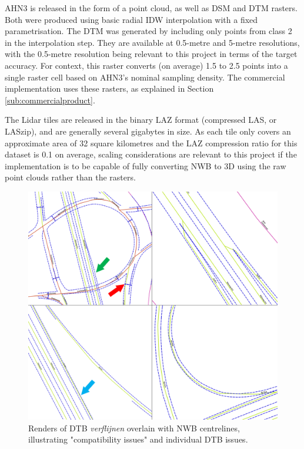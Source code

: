 AHN3 is released in the form of a point cloud, as well as DSM and DTM rasters. Both were produced using basic radial IDW interpolation with a fixed parametrisation. The DTM was generated by including only points from class 2 in the interpolation step. They are available at 0.5-metre and 5-metre resolutions, with the 0.5-metre resolution being relevant to this project in terms of the target accuracy. For context, this raster converts (on average) 1.5 to 2.5 points into a single raster cell based on AHN3's nominal sampling density. The commercial implementation uses these rasters, as explained in Section \ref{sub:commercialproduct}.

The Lidar tiles are released in the binary LAZ format (compressed LAS, or LASzip), and are generally several gigabytes in size. As each tile only covers an approximate area of 32 square kilometres and the LAZ compression ratio for this dataset is 0.1 on average, scaling considerations are relevant to this project if the implementation is to be capable of fully converting NWB to 3D using the raw point clouds rather than the rasters.

\begin{figure}[h!]
    \centering
    \includegraphics[width=0.95\linewidth]{final_report/figs/dtb_sample_07.png} 
    \caption{Renders of DTB \textit{verflijnen} overlain with NWB centrelines, illustrating "compatibility issues" and individual DTB issues.}
    \label{fig:dtbnwb}
\end{figure}

